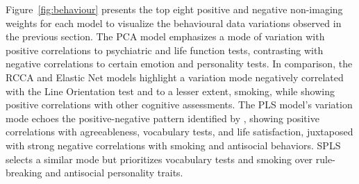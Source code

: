 Figure~\ref{fig:behaviour} presents the top eight positive and negative non-imaging weights for each model to visualize the behavioural data variations observed in the previous section. The PCA model emphasizes a mode of variation with positive correlations to psychiatric and life function tests, contrasting with negative correlations to certain emotion and personality tests. In comparison, the RCCA and Elastic Net models highlight a variation mode negatively correlated with the Line Orientation test and to a lesser extent, smoking, while showing positive correlations with other cognitive assessments. The PLS model's variation mode echoes the positive-negative pattern identified by \cite{smith2015positive}, showing positive correlations with agreeableness, vocabulary tests, and life satisfaction, juxtaposed with strong negative correlations with smoking and antisocial behaviors. SPLS selects a similar mode but prioritizes vocabulary tests and smoking over rule-breaking and antisocial personality traits.


